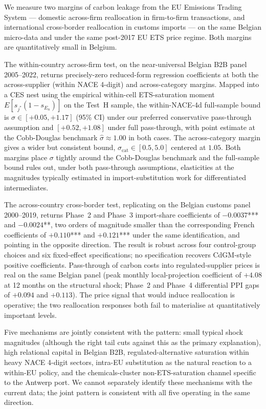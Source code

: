 We measure two margins of carbon leakage from the EU Emissions Trading System --- domestic across-firm reallocation in firm-to-firm transactions, and international cross-border reallocation in customs imports --- on the same Belgian micro-data and under the same post-2017 EU ETS price regime. Both margins are quantitatively small in Belgium.

The within-country across-firm test, on the near-universal Belgian B2B panel 2005--2022, returns precisely-zero reduced-form regression coefficients at both the across-supplier (within NACE 4-digit) and across-category margins. Mapped into a CES nest using the empirical within-cell ETS-saturation moment $E[s_{j^*}(1 - s_{E_n})]$ on the Test~H sample, the within-NACE-4d full-sample bound is $\sigma \in [+0.05, +1.17]$ (95\% CI) under our preferred conservative pass-through assumption and $[+0.52, +1.08]$ under full pass-through, with point estimate at the Cobb-Douglas benchmark $\widehat{\sigma} \approx 1.00$ in both cases. The across-category margin gives a wider but consistent bound, $\sigma_{\text{cat}} \in [0.5, 5.0]$ centered at $1.05$. Both margins place $\sigma$ tightly around the Cobb-Douglas benchmark and the full-sample bound rules out, under both pass-through assumptions, elasticities at the magnitudes typically estimated in import-substitution work for differentiated intermediates.

The across-country cross-border test, replicating \citet{CosterMejeanDiGiovanni2024} on the Belgian customs panel 2000--2019, returns Phase~2 and Phase~3 import-share coefficients of $-0.0037$*** and $-0.0024$**, two orders of magnitude smaller than the corresponding French coefficients of $+0.110$*** and $+0.121$*** under the same identification, and pointing in the opposite direction. The result is robust across four control-group choices and six fixed-effect specifications; no specification recovers CdGM-style positive coefficients. Pass-through of carbon costs into regulated-supplier prices is real on the same Belgian panel (peak monthly local-projection coefficient of $+4.08$ at 12 months on the \citet{kanzig2023unequal} structural shock; Phase~2 and Phase~4 differential PPI gaps of $+0.094$ and $+0.113$). The price signal that would induce reallocation is operative; the two reallocation responses both fail to materialise at quantitatively important levels.

Five mechanisms are jointly consistent with the pattern: small typical shock magnitudes (although the right tail cuts against this as the primary explanation), high relational capital in Belgian B2B, regulated-alternative saturation within heavy NACE 4-digit sectors, intra-EU substitution as the natural reaction to a within-EU policy, and the chemicals-cluster non-ETS-saturation channel specific to the Antwerp port. We cannot separately identify these mechanisms with the current data; the joint pattern is consistent with all five operating in the same direction.

